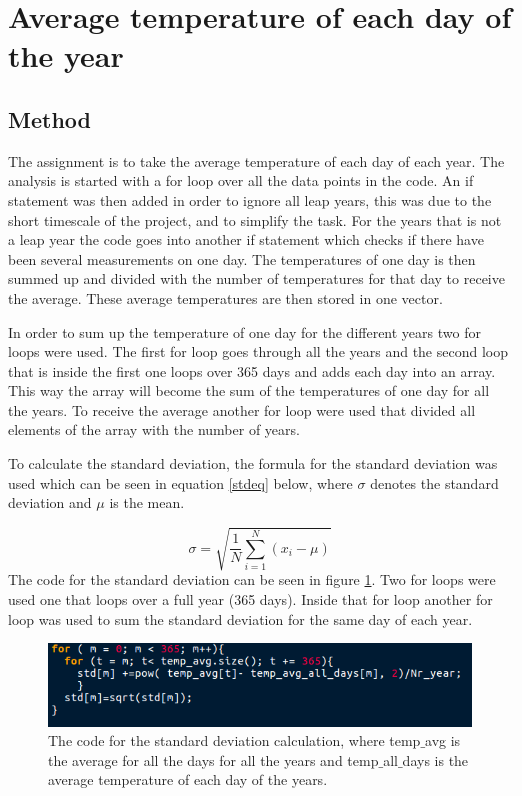 \documentclass[../main.tex]{subfiles}
\begin{document}
\section{Average temperature of each day of the year}
\subsection{Method}
The assignment is to take the average temperature of each day of each year. The analysis is started with a for loop over all the data points in the code. An if statement was then added in order to ignore all leap years, this was due to the short timescale of the project, and to simplify the task. For the years that is not a leap year the code goes into another if statement which checks if there have been several measurements on one day. The temperatures of one day is then summed up and divided with the number of temperatures for that day to receive the average. These average temperatures are then stored in one vector.

In order to sum up the temperature of one day for the different years two for loops were used. The first for loop goes through all the years and the second loop that is inside the first one loops over 365 days and adds each day into an array. This way the array will become the sum of the temperatures of one day for all the years. To receive the average another for loop were used that divided all elements of the array with the number of years.

To calculate the standard deviation, the formula for the standard deviation was used which can be seen in equation \ref{stdeq} below, where $\sigma$ denotes the standard deviation and $\mu$ is the mean.

\begin{equation}
\label{stdeq}
\sigma = \sqrt{\frac{1}{N} \sum ^N_{i=1} (x_i - \mu) }
\end{equation}
The code for the standard deviation can be seen in figure \ref{stdcode}. Two for loops were used one that loops over a full year (365 days). Inside that for loop another for loop was used to sum the standard deviation for the same day of each year.

\begin{figure}[H]
\includegraphics[scale= 0.5]{std_MNXB01.png}
\caption{The code for the standard deviation calculation, where temp$\_$avg is the average for all the days for all the years and temp$\_$all$\_$days is the average temperature of each day of the years. }
\label{stdcode}
\end{figure}
\end{document}
